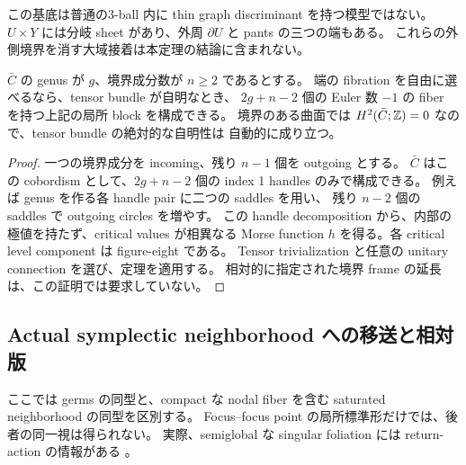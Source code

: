 \begin{remark}\label{lc:construction-branched}
この基底は普通の3-ball 内に thin graph discriminant を持つ模型ではない。
$U\times Y$ には分岐 sheet があり、外周 $\partial U$ と pants の三つの端もある。
これらの外側境界を消す大域接着は本定理の結論に含まれない。
\end{remark}

\begin{corollary}\label{lc:construction-free-curve}
$\bar C$ の genus が $g$、境界成分数が $n\ge2$ であるとする。
端の fibration を自由に選べるなら、tensor bundle が自明なとき、
$2g+n-2$ 個の Euler 数 $-1$ の fiber を持つ上記の局所 block を構成できる。
境界のある曲面では $H^2(\bar C;\mathbb Z)=0$ なので、tensor bundle の絶対的な自明性は
自動的に成り立つ。
\end{corollary}

\begin{proof}
一つの境界成分を incoming、残り $n-1$ 個を outgoing とする。
$\bar C$ はこの cobordism として、$2g+n-2$ 個の index 1 handles のみで構成できる。
例えば genus を作る各 handle pair に二つの saddles を用い、
残り $n-2$ 個の saddles で outgoing circles を増やす。
この handle decomposition から、内部の極値を持たず、critical values が相異なる
Morse function $h$ を得る。各 critical level component は figure-eight である。
Tensor trivialization と任意の unitary connection を選び、定理を適用する。
相対的に指定された境界 frame の延長は、この証明では要求していない。
\end{proof}

\subsection{Actual symplectic neighborhood への移送と相対版}

ここでは germs の同型と、compact な nodal fiber を含む saturated neighborhood の同型を区別する。
Focus--focus point の局所標準形だけでは、後者の同一視は得られない。
実際、semiglobal な singular foliation には return-action の情報がある
\cite[Theorem 2.1]{vungoc-local}。

